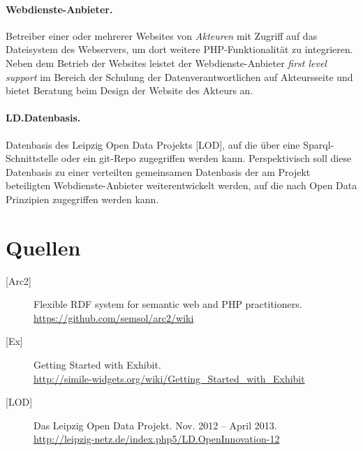 \documentclass[11pt,a4paper]{article}
\begin{document}
\paragraph{Webdienste-Anbieter.} 
Betreiber einer oder mehrerer Websites von \emph{Akteuren} mit Zugriff auf das
Dateisystem des Webservers, um dort weitere PHP-Funktionalität zu integrieren.
Neben dem Betrieb der Websites leistet der Webdienste-Anbieter \emph{first
  level support} im Bereich der Schulung der Datenverantwortlichen auf
Akteursseite und bietet Beratung beim Design der Website des Akteurs an.

\paragraph{LD.Datenbasis.} 
Datenbasis des Leipzig Open Data Projekts [LOD], auf die über eine
Sparql-Schnittstelle oder ein git-Repo zugegriffen werden kann.
Perspektivisch soll diese Datenbasis zu einer verteilten gemeinsamen
Datenbasis der am Projekt beteiligten Webdienste-Anbieter weiterentwickelt
werden, auf die nach Open Data Prinzipien zugegriffen werden kann.

\section{Quellen}

\begin{description}
\item[{[Arc2]}] Flexible RDF system for semantic web and PHP practitioners.\\ 
\url{https://github.com/semsol/arc2/wiki}

\item[{[Ex]}] Getting Started with Exhibit. \\
\url{http://simile-widgets.org/wiki/Getting_Started_with_Exhibit}

\item[{[LOD]}] Das Leipzig Open Data Projekt. Nov. 2012 -- April 2013. \\
\url{http://leipzig-netz.de/index.php5/LD.OpenInnovation-12}

\end{description}
\end{document}
